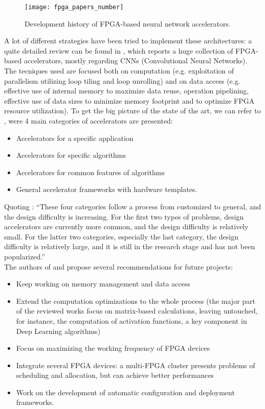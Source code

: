 \documentclass[11pt,a4paper]{article}
\begin{document}
\begin{figure}[h]
    \centering	
    \texttt{[image: fpga\_papers\_number]}
    \caption{Development history of FPGA-based neural network accelerators.}
    \label{fig:fpga_papers_number}
\end{figure}

A lot of different strategies have been tried to implement these architectures: a quite detailed review can be found in \cite{shawahna_review_2019}, which reports a huge collection of FPGA-based accelerators, mostly regarding CNNs (Convolutional Neural Networks). The tecniques used are focused both on computation (e.g. exploitation of parallelism utilizing loop tiling and loop unrolling) and on data access (e.g. effective use of internal memory to maximize data reuse, operation pipelining, effective use of data sizes to minimize memory footprint and to optimize FPGA resource utilization). To get the big picture of the state of the art, we can refer to \cite{wang_survey_2018}, were 4 main categories of accelerators are presented:
\begin{itemize}
    \item Accelerators for a specific application
    \item Accelerators for specific algorithms
    \item Accelerators for common features of algorithms
    \item General accelerator frameworks with hardware templates.
\end{itemize}
Quoting \cite{wang_survey_2018}: ``These four categories follow a process from customized to general, and the design difficulty is increasing. For the first two types of problems, design accelerators are currently more common, and the design difficulty is relatively small. For the latter two categories, especially the last category, the design difficulty is relatively large, and it is still in the research stage and has not been
popularized.''\\
The authors of \cite{wang_survey_2018} and \cite{shawahna_review_2019} propose several recommendations for future projects:
\begin{itemize}
    \item Keep working on memory management and data access
    \item Extend the computation optimizations to the whole process (the major part of the reviewed works focus on matrix-based calculations, leaving untouched, for instance, the computation of activation functions, a key component in Deep Learning algorithms)
    \item Focus on maximizing the working frequency of FPGA devices
    \item Integrate several FPGA devices: a multi-FPGA cluster presents problems of scheduling and allocation, but can achieve better performances
    \item Work on the development of automatic configuration and deployment frameworks.
\end{itemize}
\end{document}
